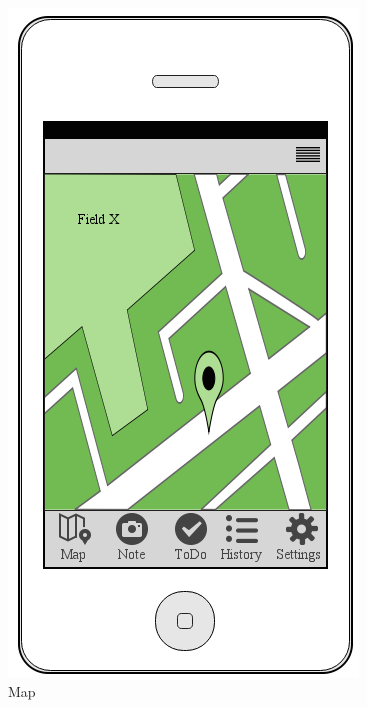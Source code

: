 \documentclass[12pt]{article}
\begin{document}
\begin{figure}[ht]
	\includegraphics[width=\linewidth, height=0.4\textheight, keepaspectratio=true]{mockups/Map.png}
	\caption{Map}
	\endminipage\hfill
\end{figure}
\end{document}
